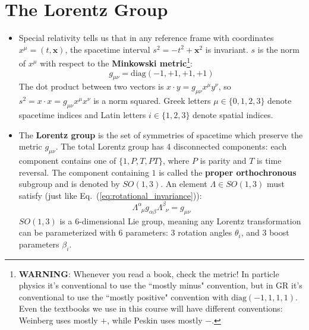 \documentclass[12pt, oneside]{article}   	%
\theoremstyle{definition}
\begin{document}
\section*{The Lorentz Group}

\begin{itemize}
	\item Special relativity tells us that in any reference frame with coordinates $x^\mu = (t, \bm x)$, 
	the spacetime interval $s^2 = -t^2 + \bm x^2$ is invariant. $s$ is the norm of $x^\mu$ with respect to 
	the \textbf{Minkowski metric}\footnote{\textbf{WARNING}: Whenever you read a book, check the metric! In particle physics it's conventional 
	to use the ``mostly minus" convention, but in GR it's conventional to use the ``mostly positive" convention with $\mathrm{diag}(-1, 1, 1, 1)$. 
	Even the textbooks we use in this course will have different conventions: Weinberg uses mostly $+$, while Peskin uses mostly $-$.}:
	\begin{equation}
		g_{\mu\nu} = \mathrm{diag}(-1, +1, +1, +1)
	\end{equation}
	The dot product between two vectors is $x\cdot y = g_{\mu\nu} x^\mu y^\nu$, so $s^2 = x\cdot x = 
	g_{\mu\nu} x^\mu x^\nu$ is a norm squared. Greek letters $\mu\in \{0, 
	1, 2, 3\}$ denote spacetime indices and Latin letters $i\in \{1, 2, 3\}$ denote spatial indices.
	
	\item The \textbf{Lorentz group} is the set of symmetries of spacetime which preserve the metric $g_{\mu\nu}$. 
	The total Lorentz group has 4 disconnected components: each component contains one of $\{1, P, T, PT\}$, where $P$ 
	is parity and $T$ is time reversal. The component containing $1$ is called the \textbf{proper orthochronous} subgroup 
	and is denoted by $SO(1, 3)$. An element $\Lambda\in SO(1, 3)$ must satisfy (just like 
	Eq.~(\ref{eq:rotational_invariance})):
	\begin{equation}
		\Lambda^{\alpha}_{\;\;\mu} g_{\alpha\beta} \Lambda^\beta_{\;\;\nu} = g_{\mu\nu}
		\label{eq:lorentz_metric_invariance}
	\end{equation}
	$SO(1, 3)$ is a 6-dimensional Lie group, meaning any Lorentz transformation can be 
	parameterized with 6 parameters: 3 rotation angles $\theta_i$, and 3 boost parameters $\beta_i$. 
	

\end{itemize}
\end{document}
